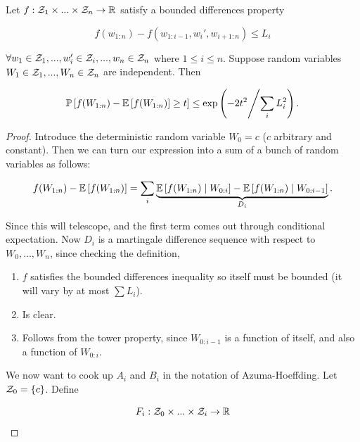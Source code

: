 \documentclass[11pt]{scrartcl}
\begin{document}
\begin{theorem}
\label{Bounded differences inequality}
Let $f:\mathcal{Z}_1 \times ... \times \mathcal{Z}_n \rightarrow \mathbb R$ satisfy a bounded differences property

\begin{equation}
    f(w_{1:n}) - f(w_{1:i-1}, w_i', w_{i+1:n}) \le L_i
\end{equation}

$\forall w_1 \in \mathcal{Z}_1, ... , w_i' \in \mathcal{Z}_i, ... , w_n \in \mathcal{Z}_n$ where $1 \le i \le n$. Suppose random variables $W_1 \in \mathcal{Z}_1, ... , W_n \in \mathcal{Z}_n$ are independent. Then

\begin{equation}
    \mathbb{P} \left[  f(W_{1:n}) - \mathbb{E} \left[ f(W_{1:n}) \right]  \ge t \right] \le \text{exp} \left( - 2t^2 \middle/ \sum_i L_i^2 \right).
\label{Lecture 5:Hoeffding 2.0}
\end{equation}

\begin{proof}
Introduce the deterministic random variable $W_0 = c$ ($c$ arbitrary and constant). Then we can turn our expression into a sum of a bunch of random variables as follows:

\begin{equation}
    f(W_{1:n}) - \mathbb{E} \left[ f(W_{1:n}) \right] = \sum_i \underbrace{\mathbb{E} \left[ f(W_{1:n}) \mid W_{0:i} \right] - \mathbb{E} \left[ f(W_{1:n}) \mid W_{0:i-1} \right]}_{D_i}.
\end{equation}

Since this will telescope, and the first term comes out through conditional expectation. Now $D_i$ is a martingale difference sequence with respect to $W_0, ... , W_n$, since checking the definition,

\begin{enumerate}
\item $f$ satisfies the bounded differences inequality so itself must be bounded (it will vary by at most $\sum L_i$).
\item Is clear.
\item Follows from the tower property, since $W_{0:i-1}$ is a function of itself, and also a function of $W_{0:i}$.
\end{enumerate}


We now want to cook up $A_i$ and $B_i$ in the notation of Azuma-Hoeffding. Let $\mathcal{Z}_0 = \{c\}$. Define

\begin{equation}
    F_i : \mathcal{Z}_0 \times ... \times \mathcal{Z}_i \rightarrow \mathbb R
\end{equation}


\end{proof}
\end{theorem}
\end{document}
